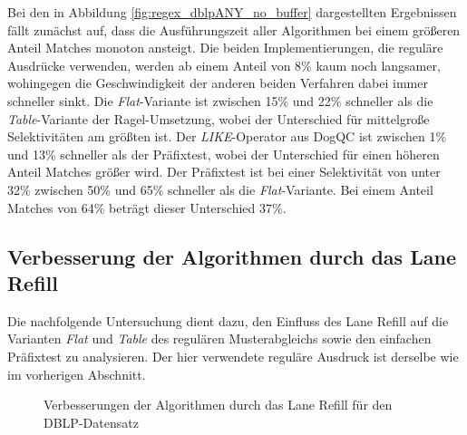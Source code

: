 Bei den in Abbildung \ref{fig:regex_dblpANY_no_buffer} dargestellten Ergebnissen fällt zunächst auf, dass die Ausführungszeit aller Algorithmen bei einem größeren Anteil Matches monoton ansteigt.
Die beiden Implementierungen, die reguläre Ausdrücke verwenden, werden ab einem Anteil von 8\% kaum noch langsamer, wohingegen die Geschwindigkeit der anderen beiden Verfahren dabei immer schneller sinkt.
Die \emph{Flat}-Variante ist zwischen 15\% und 22\% schneller als die \emph{Table}-Variante der Ragel-Umsetzung, wobei der Unterschied für mittelgroße Selektivitäten am größten ist.
Der \emph{LIKE}-Operator aus DogQC ist zwischen 1\% und 13\% schneller als der Präfixtest, wobei der Unterschied für einen höheren Anteil Matches größer wird.
Der Präfixtest ist bei einer Selektivität von unter 32\% zwischen 50\% und 65\% schneller als die \emph{Flat}-Variante.
Bei einem Anteil Matches von 64\% beträgt dieser Unterschied 37\%.

\subsection{Verbesserung der Algorithmen durch das Lane Refill}
\label{sec:regex_evaluation_beobachtung_2}

Die nachfolgende Untersuchung dient dazu, den Einfluss des Lane Refill auf die Varianten \emph{Flat} und \emph{Table} des regulären Musterabgleichs sowie den einfachen Präfixtest zu analysieren.
Der hier verwendete reguläre Ausdruck ist derselbe wie im vorherigen Abschnitt.

\begin{figure}[]
	\centering
	\caption{Verbesserungen der Algorithmen durch das Lane Refill für den DBLP-Datensatz}
	\label{fig:regex_dblpANY_buffer}
\end{figure}


